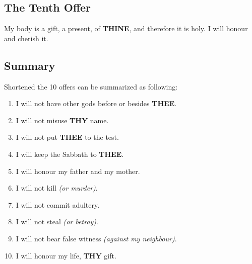 \documentclass[12pt,a4paper]{article}
\newcommand{\Thee}[0]{\textbf{THEE}}
\newcommand{\Thine}[0]{\textbf{THINE}}
\newcommand{\Thy}[0]{\textbf{THY}}
\begin{document}
	\subsection{The Tenth Offer} \label{TheTenthOffer}
		My body is a gift, a present, of {\Thine},
		and therefore it is holy.
		I will honour and cherish it.

	\subsection{Summary}
		Shortened the 10 offers can be summarized as following:
		\\
		\begin{enumerate}[nosep]
			\item I will not have other gods before or besides {\Thee}.
			\item I will not misuse {\Thy} name.
			\item I will not put {\Thee} to the test.
			\item I will keep the Sabbath to {\Thee}.
			\item I will honour my father and my mother.
			\item I will not kill \textit{(or murder)}.
			\item I will not commit adultery.
			\item I will not steal \textit{(or betray)}.
			\item I will not bear false witness \textit{(against my neighbour)}.
			\item I will honour my life, {\Thy} gift.
		\end{enumerate}
		
\end{document}
